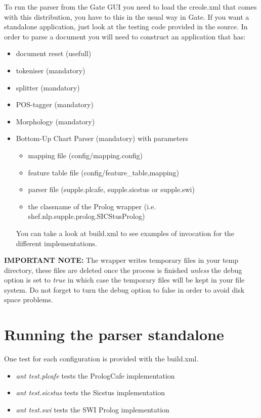 \documentclass[a4paper,titlepage,openany,twoside]{book}
\begin{document}
To run the parser from the Gate GUI you need to load the creole.xml
that comes with this distribution, you have to this in the usual way
in Gate. If you want  a standalone application, just look at the
testing code provided in the source. In order to parse a document you will
need to construct an application that has:

\begin{itemize}
\item document reset (usefull)

\item tokeniser (mandatory)

\item splitter (mandatory)

\item POS-tagger (mandatory)

\item Morphology (mandatory)

\item Bottom-Up Chart Parser (mandatory) with parameters
\begin{itemize}
\item mapping file (config/mapping.config)
\item feature table file (config/feature\_table,mapping)
\item parser file (supple.plcafe, supple.sicstus or supple.swi)
\item the classname of the Prolog wrapper (i.e. shef.nlp.supple.prolog.SICStusProlog)
\end{itemize}
You can take a look at build.xml to see examples of invocation for
the different implementations.

\end{itemize} 

{\bf IMPORTANT NOTE:} The wrapper writes temporary files
in your temp directory, these files are deleted once the
process is finished {\em unless} the debug option is set to {\em true}
in which case the temporary files will be kept in your file system.
Do not forget to  turn the debug option to false in order to avoid 
disk space problems.

\chapter{Running the parser standalone}

One test for each configuration is provided with the build.xml. 

\begin{itemize}

\item {\em ant test.plcafe} tests the PrologCafe implementation

\item {\em ant test.sicstus} tests the Sicstus implementation

\item {\em ant test.swi} tests the SWI Prolog implementation


\end{itemize}
\end{document}
